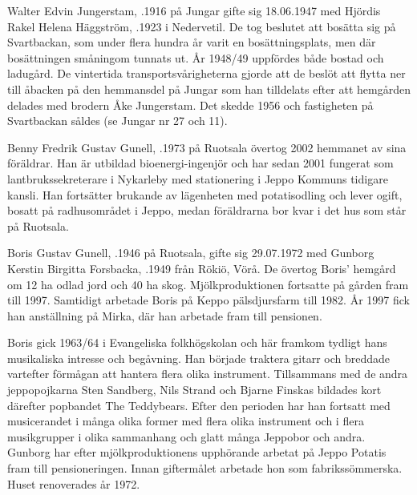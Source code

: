 Walter Edvin Jungerstam, .1916 på Jungar gifte sig 18.06.1947 med Hjördis Rakel Helena Häggström, .1923 i Nedervetil. De tog beslutet att bosätta sig på Svartbackan, som under flera hundra år varit en bosättningsplats, men där bosättningen småningom tunnats ut. År 1948/49 uppfördes både bostad och ladugård. De vintertida
transportsvårigheterna gjorde att de beslöt att flytta ner till åbacken på den hemmansdel på Jungar som han tilldelats efter att hemgården delades med brodern Åke Jungerstam. Det skedde 1956 och fastigheten på Svartbackan såldes (se Jungar nr 27 och 11).






Benny Fredrik Gustav Gunell, .1973 på Ruotsala övertog 2002 hemmanet av sina föräldrar. Han är utbildad bioenergi-ingenjör och har sedan 2001 fungerat som lantbrukssekreterare i Nykarleby med stationering i Jeppo Kommuns tidigare kansli. Han fortsätter brukande av lägenheten med potatisodling  och lever ogift, bosatt på radhusområdet i Jeppo, medan föräldrarna bor kvar i det hus som står på Ruotsala.


Boris Gustav Gunell, .1946 på Ruotsala, gifte sig 29.07.1972 med Gunborg Kerstin Birgitta Forsbacka, .1949 från Rökiö, Vörå. De övertog Boris' hemgård om 12 ha odlad jord och 40 ha skog. Mjölkproduktionen fortsatte på gården fram till 1997. Samtidigt arbetade Boris på Keppo pälsdjursfarm till 1982. År 1997 fick han anställning på Mirka, där han arbetade fram till pensionen.

Boris gick 1963/64 i Evangeliska folkhögskolan och här framkom tydligt hans musikaliska intresse och begåvning. Han började traktera gitarr och breddade vartefter förmågan att hantera flera olika instrument. Tillsammans med de andra jeppopojkarna Sten Sandberg, Nils Strand och Bjarne Finskas bildades kort därefter popbandet The Teddybears. Efter den perioden har han fortsatt med musicerandet i många	olika former med flera olika instrument och i flera musikgrupper i olika sammanhang och glatt många Jeppobor och andra. Gunborg har efter mjölkproduktionens upphörande arbetat på Jeppo Potatis fram till pensioneringen. Innan giftermålet arbetade hon som fabrikssömmerska. Huset renoverades år 1972.
\begin{jhchildren}
  \item {}
  \item {}
\end{jhchildren}


